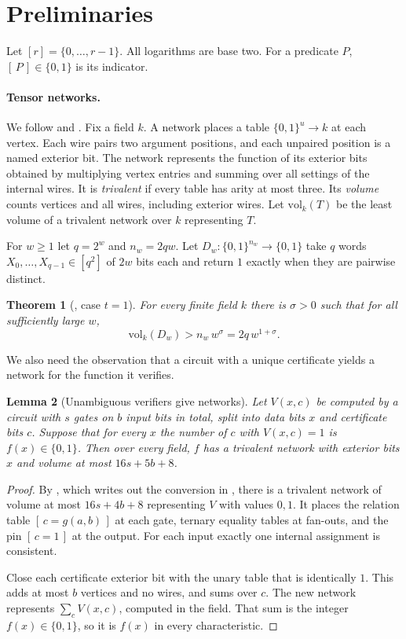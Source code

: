 \documentclass[11pt]{article}
\newtheorem{theorem}{Theorem}[section]
\newtheorem{lemma}[theorem]{Lemma}
\theoremstyle{definition}
\theoremstyle{remark}
\newcommand{\vol}{\mathrm{vol}}
\newcommand{\ind}[1]{[\,#1\,]}
\begin{document}
\section{Preliminaries}\label{sec:prelim}

Let $[r]=\{0,\dots,r-1\}$. All logarithms are base two. For a predicate
$P$, $\ind{P}\in\{0,1\}$ is its indicator.

\paragraph{Tensor networks.} We follow \cite[Section~2.1]{OAI} and
\cite[Section~2]{R06}. Fix a field $k$. A network places a table
$\{0,1\}^u\to k$ at each vertex. Each wire pairs two argument positions,
and each unpaired position is a named exterior bit. The network represents
the function of its exterior bits obtained by multiplying vertex entries
and summing over all settings of the internal wires. It is
\emph{trivalent} if every table has arity at most three. Its
\emph{volume} counts vertices and all wires, including exterior wires.
Let $\vol_k(T)$ be the least volume of a trivalent network over $k$
representing $T$.

For $w\ge1$ let $q=2^w$ and $n_w=2qw$. Let $D_w:\{0,1\}^{n_w}\to\{0,1\}$
take $q$ words $X_0,\dots,X_{q-1}\in[q^2]$ of $2w$ bits each and return
$1$ exactly when they are pairwise distinct.

\begin{theorem}[{\cite[Theorem~2.2]{OAI}}, case $t=1$]\label{thm:import}
For every finite field $k$ there is $\sigma>0$ such that for all
sufficiently large $w$,
\[
\vol_k(D_w)>n_w\,w^{\sigma}=2q\,w^{1+\sigma}.
\]
\end{theorem}

We also need the observation that a circuit with a unique certificate
yields a network for the function it verifies.

\begin{lemma}[Unambiguous verifiers give networks]\label{lem:verifier}
Let $V(x,c)$ be computed by a circuit with $s$ gates on $b$ input bits in
total, split into data bits $x$ and certificate bits $c$. Suppose that for
every $x$ the number of $c$ with $V(x,c)=1$ is $f(x)\in\{0,1\}$. Then over
every field, $f$ has a trivalent network with exterior bits $x$ and volume
at most $16s+5b+8$.
\end{lemma}
\begin{proof}
By \cite[Lemma~4.1]{R06}, which writes out the conversion in
\cite[proof of Proposition~2.3]{OAI}, there is a trivalent network of
volume at most $16s+4b+8$ representing $V$ with values $0,1$. It places the
relation table $\ind{c=g(a,b)}$ at each gate, ternary equality tables at
fan-outs, and the pin $\ind{c=1}$ at the output. For each input exactly one
internal assignment is consistent.

Close each certificate exterior bit with the unary table that is
identically $1$. This adds at most $b$ vertices and no wires, and sums
over $c$. The new network represents $\sum_cV(x,c)$, computed in the field.
That sum is the integer $f(x)\in\{0,1\}$, so it is $f(x)$ in every
characteristic.
\end{proof}
\end{document}
